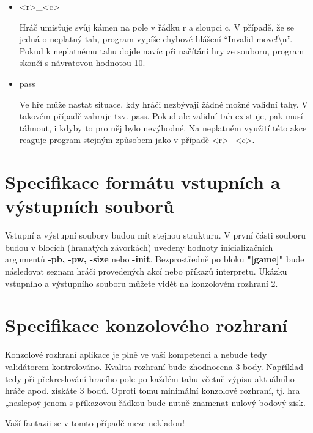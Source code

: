 \documentclass[
12pt,
a4paper,
pdftex,
czech,
titlepage
]{report}
\begin{document}
\begin{itemize}[label={}]
\item <r>\_<c>
\hspace{0.5cm} \begin{minipage}[t]{0.7\textwidth}  Hráč umisťuje svůj kámen na pole v řádku r a sloupci c. V případě, že se jedná
o neplatný tah, program vypíše chybové hlášení 
``Invalid move!\textbackslash n''. Pokud k neplatnému tahu dojde navíc při načítání hry ze souboru, program skončí s návratovou
hodnotou 10.
\end{minipage}

\item pass
\hspace{0.8cm} \begin{minipage}[t]{0.8\textwidth} Ve hře může nastat situace, kdy hráči nezbývají žádné možné validní tahy. V takovém
případě zahraje tzv. pass. Pokud ale validní tah existuje, pak musí táhnout, i kdyby
to pro něj bylo nevýhodné. Na neplatném využití této akce reaguje program stejným
způsobem jako v případě <r>\_<c>.
\end{minipage}
\end{itemize}

\section*{Specifikace formátu vstupních a výstupních souborů}
Vstupní a výstupní soubory budou mít stejnou strukturu. V první části souboru budou v blocích
(hranatých závorkách) uvedeny hodnoty inicializačních argumentů \textbf{-pb, -pw, -size} nebo \textbf{
-init}.
Bezprostředně po bloku \textbf{"[game]"} bude následovat seznam hráči provedených akcí nebo příkazů
interpretu. Ukázku vstupního a výstupního souboru můžete vidět na konzolovém rozhraní 2.


\section*{Specifikace konzolového rozhraní}
Konzolové rozhraní aplikace je plně ve vaší kompetenci a nebude tedy validátorem kontrolováno.
Kvalita rozhraní bude zhodnocena 3 body. Například tedy při překreslování hracího pole po každém
tahu včetně výpisu aktuálního hráče apod. získáte 3 bodů. Oproti tomu minimální konzolové
rozhraní, tj. hra „naslepoÿ jenom s příkazovou řádkou bude nutně znamenat nulový bodový zisk.

\hfill {Vaší fantazii se v tomto případě meze nekladou!}
\end{document}
